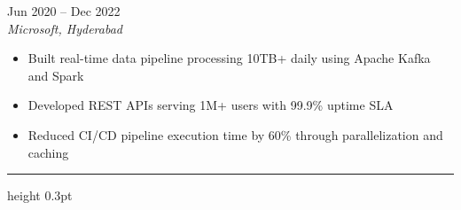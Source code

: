 \documentclass[10pt,a4paper]{article}
\begin{document}
 \hfill {\small\color{accentcolor}Jun 2020 -- Dec 2022}\\
{\itshape Microsoft, Hyderabad}
\begin{itemize}[leftmargin=1em, itemsep=0pt, topsep=3pt, label={\color{accentcolor}\textbullet}]
\item \small Built real-time data pipeline processing 10TB+ daily using Apache Kafka and Spark
\item \small Developed REST APIs serving 1M+ users with 99.9\% uptime SLA
\item \small Reduced CI/CD pipeline execution time by 60\% through parallelization and caching
\end{itemize}

\vspace{4pt}
{\color{rulecolor}\hrule height 0.3pt}
\vspace{4pt}
\end{document}
